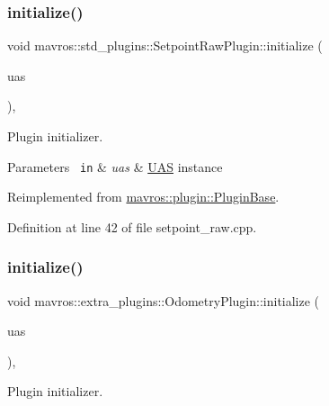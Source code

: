 \subsubsection{\texorpdfstring{initialize()}{initialize()}\hspace{0.1cm}{\footnotesize\ttfamily [25/41]}}
{\footnotesize\ttfamily void mavros\+::std\+\_\+plugins\+::\+Setpoint\+Raw\+Plugin\+::initialize (\begin{DoxyParamCaption}\item[{\mbox{\hyperlink{classmavros_1_1UAS}{U\+AS}} \&}]{uas }\end{DoxyParamCaption})\hspace{0.3cm}{\ttfamily [inline]}, {\ttfamily [virtual]}}



Plugin initializer. 


\begin{DoxyParams}[1]{Parameters}
\mbox{\texttt{ in}}  & {\em uas} & {\ttfamily \mbox{\hyperlink{classmavros_1_1UAS}{U\+AS}}} instance \\
\hline
\end{DoxyParams}


Reimplemented from \mbox{\hyperlink{group__plugin_gad5313a41da4d26acbbabf008cdc21e82}{mavros\+::plugin\+::\+Plugin\+Base}}.



Definition at line 42 of file setpoint\+\_\+raw.\+cpp.

\mbox{\label{group__plugin_gafc4d5bae52e8335f3fd027ef6c664c5a}} 
\subsubsection{\texorpdfstring{initialize()}{initialize()}\hspace{0.1cm}{\footnotesize\ttfamily [26/41]}}
{\footnotesize\ttfamily void mavros\+::extra\+\_\+plugins\+::\+Odometry\+Plugin\+::initialize (\begin{DoxyParamCaption}\item[{\mbox{\hyperlink{classmavros_1_1UAS}{U\+AS}} \&}]{uas }\end{DoxyParamCaption})\hspace{0.3cm}{\ttfamily [inline]}, {\ttfamily [virtual]}}



Plugin initializer. 


